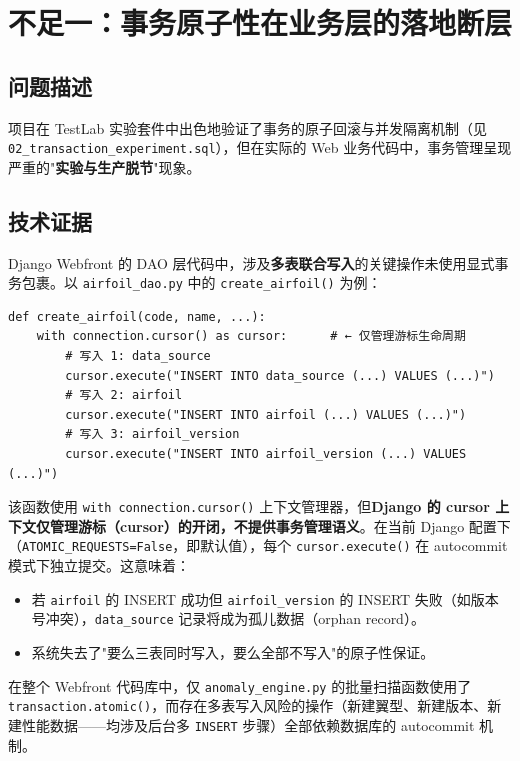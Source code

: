 \documentclass[UTF8,a4paper,11pt]{ctexart}
\begin{document}
\section{不足一：事务原子性在业务层的落地断层}

\subsection{问题描述}

项目在 TestLab 实验套件中出色地验证了事务的原子回滚与并发隔离机制（见 \texttt{02\_transaction\_experiment.sql}），但在实际的 Web 业务代码中，事务管理呈现严重的"\textbf{实验与生产脱节}"现象。

\subsection{技术证据}

Django Webfront 的 DAO 层代码中，涉及\textbf{多表联合写入}的关键操作未使用显式事务包裹。以 \texttt{airfoil\_dao.py} 中的 \texttt{create\_airfoil()} 为例：

\begin{lstlisting}[caption=多表写入未包裹事务（airfoil\_dao.py）]
def create_airfoil(code, name, ...):
    with connection.cursor() as cursor:      # ← 仅管理游标生命周期
        # 写入 1: data_source
        cursor.execute("INSERT INTO data_source (...) VALUES (...)")
        # 写入 2: airfoil
        cursor.execute("INSERT INTO airfoil (...) VALUES (...)")
        # 写入 3: airfoil_version
        cursor.execute("INSERT INTO airfoil_version (...) VALUES (...)")
\end{lstlisting}

该函数使用 \texttt{with connection.cursor()} 上下文管理器，但\textbf{Django 的 cursor 上下文仅管理游标（cursor）的开闭，不提供事务管理语义}。在当前 Django 配置下（\texttt{ATOMIC\_REQUESTS=False}，即默认值），每个 \texttt{cursor.execute()} 在 autocommit 模式下独立提交。这意味着：
\begin{itemize}
    \item 若 \texttt{airfoil} 的 INSERT 成功但 \texttt{airfoil\_version} 的 INSERT 失败（如版本号冲突），\texttt{data\_source} 记录将成为孤儿数据（orphan record）。
    \item 系统失去了"要么三表同时写入，要么全部不写入"的原子性保证。
\end{itemize}

在整个 Webfront 代码库中，仅 \texttt{anomaly\_engine.py} 的批量扫描函数使用了 \texttt{transaction.atomic()}，而存在多表写入风险的操作（新建翼型、新建版本、新建性能数据——均涉及后台多 \texttt{INSERT} 步骤）全部依赖数据库的 autocommit 机制。
\end{document}
